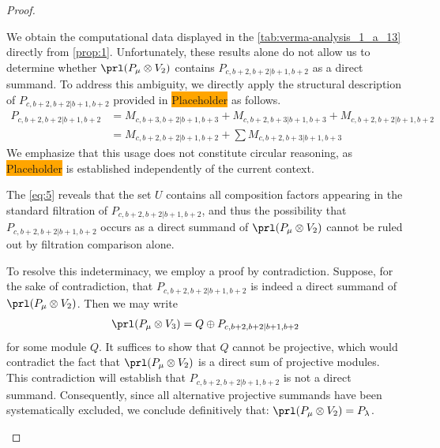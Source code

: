 \begin{proof}
\begin{enumerate}
\begin{enumerate}
\begin{enumerate}
We obtain the computational data displayed in the \cref{tab:verma-analysis_1_a_13} directly from \cref{prop:1}. Unfortunately, these results alone do not allow us to determine whether $\prl(P_\mu \otimes V_2)$ contains $P_{c,b+2,b+2|b+1,b+2}$ as a direct summand. To address this ambiguity, we directly apply the structural description of $P_{c,b+2,b+2|b+1,b+2}$ provided in \colorbox{orange}{Placeholder} as follows.
\begin{equation}\label{eq:5}
  \begin{aligned}
    P_{c,b+2,b+2|b+1,b+2} &=M_{c,b+3,b+2|b+1,b+3}
+M_{c,b+2,b+3|b+1,b+3}
+M_{c,b+2,b+2|b+1,b+2}\\
                          &=
 M_{c,b+2,b+2|b+1,b+2}
+\sum M_{c,b+2,b+3|b+1,b+3}
  \end{aligned}
\end{equation}
We emphasize that this usage does not constitute circular reasoning, as \colorbox{orange}{Placeholder} is established independently of the current context.

The \cref{eq:5} reveals that the set $U$ contains all composition factors appearing in the standard filtration of $P_{c,b+2,b+2|b+1,b+2}$, and thus the possibility that $P_{c,b+2,b+2|b+1,b+2}$ occurs as a direct summand of $\prl(P_\mu \otimes V_2)$ cannot be ruled out by filtration comparison alone.

To resolve this indeterminacy, we employ a proof by contradiction. Suppose, for the sake of contradiction, that $P_{c,b+2,b+2|b+1,b+2}$ is indeed a direct summand of $\prl(P_\mu \otimes V_2)$. Then we may write
\begin{equation}\notag
  \begin{aligned}
\prl(P_\mu \otimes V_3) = Q \oplus P_{c,b+2,b+2|b+1,b+2}
  \end{aligned}
\end{equation}
for some module $Q$. It suffices to show that $Q$ cannot be projective, which would contradict the fact that $\prl(P_\mu \otimes V_2)$ is a direct sum of projective modules. This contradiction will establish that $P_{c,b+2,b+2|b+1,b+2}$ is not a direct summand. Consequently, since all alternative projective summands have been systematically excluded, we conclude definitively that: $\prl(P_\mu \otimes V_2) = P_\lambda$.


\end{enumerate}
\end{enumerate}
\end{enumerate}
\end{proof}
